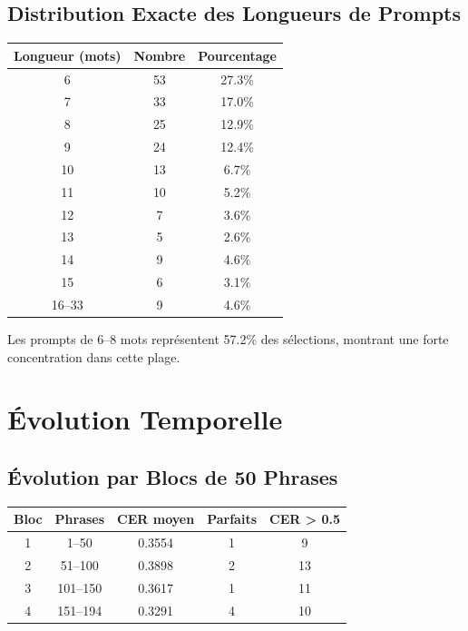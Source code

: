 \documentclass[12pt,a4paper]{article}
\begin{document}
\subsection{Distribution Exacte des Longueurs de Prompts}

\begin{center}
\begin{tabular}{|c|c|c|}
\hline
\textbf{Longueur (mots)} & \textbf{Nombre} & \textbf{Pourcentage} \\
\hline
6 & 53 & 27.3\% \\
7 & 33 & 17.0\% \\
8 & 25 & 12.9\% \\
9 & 24 & 12.4\% \\
10 & 13 & 6.7\% \\
11 & 10 & 5.2\% \\
12 & 7 & 3.6\% \\
13 & 5 & 2.6\% \\
14 & 9 & 4.6\% \\
15 & 6 & 3.1\% \\
16--33 & 9 & 4.6\% \\
\hline
\end{tabular}
\end{center}

Les prompts de 6--8 mots représentent 57.2\% des sélections, montrant une forte concentration dans cette plage.

\section{Évolution Temporelle}

\subsection{Évolution par Blocs de 50 Phrases}

\begin{center}
\begin{tabular}{|c|c|c|c|c|}
\hline
\textbf{Bloc} & \textbf{Phrases} & \textbf{CER moyen} & \textbf{Parfaits} & \textbf{CER > 0.5} \\
\hline
1 & 1--50 & 0.3554 & 1 & 9 \\
2 & 51--100 & 0.3898 & 2 & 13 \\
3 & 101--150 & 0.3617 & 1 & 11 \\
4 & 151--194 & 0.3291 & 4 & 10 \\
\hline
\end{tabular}
\end{center}
\end{document}
